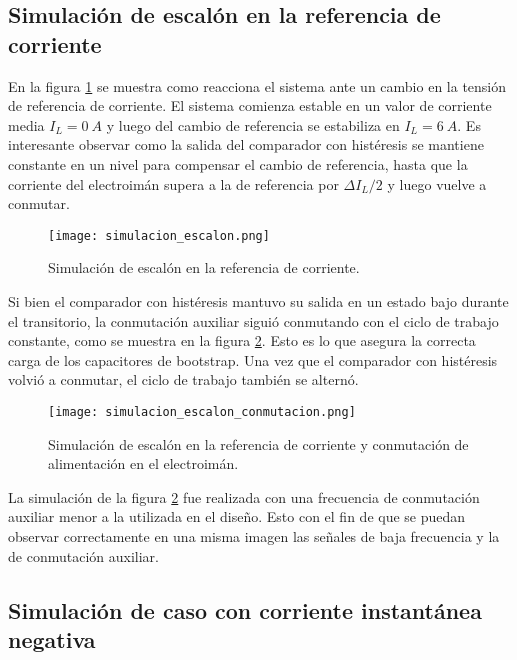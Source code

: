 \subsection{Simulación de escalón en la referencia de corriente}

En la figura \ref{fig:simulacion_escalon} se muestra como reacciona el sistema ante un cambio en la tensión de referencia de corriente. El sistema comienza estable en un valor de corriente media $I_L=0\:A$ y luego del cambio de referencia se estabiliza en $I_L=6\:A$. Es interesante observar como la salida del comparador con histéresis se mantiene constante en un nivel para compensar el cambio de referencia, hasta que la corriente del electroimán supera a la de referencia por $\Delta I_L /2$ y luego vuelve a conmutar. 

\begin{figure}[H]
	\centering
	\texttt{[image: simulacion\_escalon.png]}
	\caption{Simulación de escalón en la referencia de corriente.}
	\label{fig:simulacion_escalon}
\end{figure}

Si bien el comparador con histéresis mantuvo su salida en un estado bajo durante el transitorio, la conmutación auxiliar siguió conmutando con el ciclo de trabajo constante, como se muestra en la figura \ref{fig:simulacion_escalon_conmutacion}. Esto es lo que asegura la correcta carga de los capacitores de bootstrap. Una vez que el comparador con histéresis volvió a conmutar, el ciclo de trabajo también se alternó.

\begin{figure}[H]
	\centering
	\texttt{[image: simulacion\_escalon\_conmutacion.png]}
	\caption{Simulación de escalón en la referencia de corriente y conmutación de alimentación en el electroimán.}
	\label{fig:simulacion_escalon_conmutacion}
\end{figure}

La simulación de la figura \ref{fig:simulacion_escalon_conmutacion} fue realizada con una frecuencia de conmutación auxiliar menor a la utilizada en el diseño. Esto con el fin de que se puedan observar correctamente en una misma imagen las señales de baja frecuencia y la de conmutación auxiliar.

\subsection{Simulación de caso con corriente instantánea negativa}

